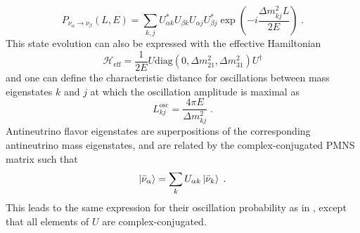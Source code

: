 \begin{equation}
    P_{\nu_\alpha \rightarrow \nu_\beta}(L,E) = \sum_{k,j}U^*_{\alpha k}U_{\beta k}U_{\alpha j}U_{\beta j}^* \exp(-i\frac{\Delta m_{kj}^2 L}{2E})\;.\label{eq:vac-oscprob}
\end{equation}
This state evolution can also be expressed with the effective Hamiltonian
\begin{equation}
    \mathcal{H}_\mathrm{eff} = \frac{1}{2E}U\mathrm{diag}(0,\Delta m_{21}^2, \Delta m_{31}^2)U^\dag
\end{equation}
and one can define the characteristic distance for oscillations between mass eigenstates $k$ and $j$ at which the oscillation amplitude is maximal as
\begin{equation}
    L_{kj}^\mathrm{osc} = \frac{4\pi E}{\Delta m_{kj}^2}\;.\label{eq:oscillation-length}
\end{equation}
Antineutrino flavor eigenstates are superpositions of the corresponding antineutrino mass eigenstates, and are related by the complex-conjugated PMNS matrix such that
\begin{equation}
    \ket{\bar{\nu}_\alpha} = \sum_k U_{\alpha k}\ket{\bar{\nu}_k}\;.\label{eq:flavor-state-def-antinu}
\end{equation}
This leads to the same expression for their oscillation probability as in , except that all elements of $U$ are complex-conjugated.

